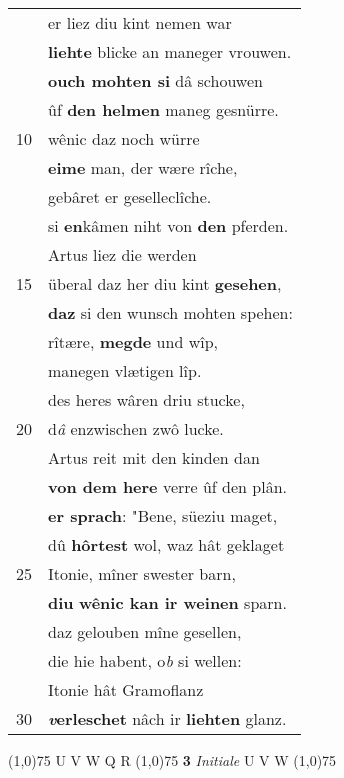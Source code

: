 \documentclass[8pt,a4paper,notitlepage]{article}
\begin{document}
\begin{table}[ht]
\begin{minipage}[t]{0.5\linewidth}
\begin{tabular}{rl}
 & er liez diu kint nemen war\\ 
 & \textbf{liehte} blicke an maneger vrouwen.\\ 
 & \textbf{ouch mohten si} dâ schouwen\\ 
 & ûf \textbf{den helmen} maneg gesnürre.\\ 
10 & wênic daz noch würre\\ 
 & \textbf{eime} man, der wære rîche,\\ 
 & gebâret er geselleclîche.\\ 
 & si \textbf{en}kâmen niht von \textbf{den} pferden.\\ 
 & Artus liez die werden\\ 
15 & überal daz her diu kint \textbf{gesehen},\\ 
 & \textbf{daz} si den wunsch mohten spehen:\\ 
 & rîtære, \textbf{megde} und wîp,\\ 
 & manegen vlætigen lîp.\\ 
 & des heres wâren driu stucke,\\ 
20 & d\textit{â} enzwischen zwô lucke.\\ 
 & Artus reit mit den kinden dan\\ 
 & \textbf{von dem here} verre ûf den plân.\\ 
 & \textbf{er sprach}: "Bene, süeziu maget,\\ 
 & dû \textbf{hôrtest} wol, waz hât geklaget\\ 
25 & Itonie, mîner swester barn,\\ 
 & \textbf{diu} \textbf{wênic kan ir weinen} sparn.\\ 
 & daz gelouben mîne gesellen,\\ 
 & die hie habent, o\textit{b} si wellen:\\ 
 & Itonie hât Gramoflanz\\ 
30 & \textbf{\textit{v}erleschet} nâch ir \textbf{liehten} glanz.\\ 
\end{tabular}
\scriptsize
\line(1,0){75} \newline
U V W Q R \newline
\line(1,0){75} \newline
\textbf{3} \textit{Initiale} U V W  \newline
\line(1,0){75} \newline

\end{minipage}
\end{table}
\end{document}
